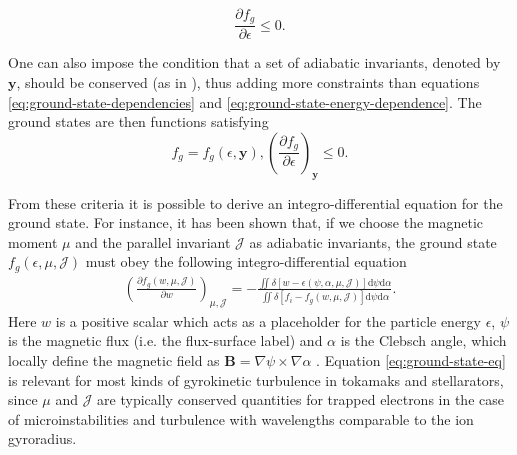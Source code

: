     \begin{equation}
        \frac{\partial f_g}{\partial \epsilon} \leq 0.
        \label{eq:ground-state-energy-dependence}
    \end{equation}
    \par
    One can also impose the condition that a set of adiabatic invariants, denoted by $\boldsymbol{y}$, should be conserved (as in \cite{Helander2017AvailablePlasmas,Helander2020AvailablePlasmas}), thus adding more constraints than equations \eqref{eq:ground-state-dependencies} and \eqref{eq:ground-state-energy-dependence}. The ground states are then functions satisfying
    \begin{subequations}
    \begin{equation}
        f_g = f_g(\epsilon, \boldsymbol{y}),
    \end{equation}
    \begin{equation}
        \left( \frac{\partial f_g}{ \partial \epsilon } \right)_{\boldsymbol{y}}  \leq 0.
    \end{equation}
        \label{eq:ground-state-decrease-adiabatic}
    \end{subequations}
    \par 
    From these criteria it is possible to derive an integro-differential equation for the ground state. For instance, it has been shown that, if we choose the magnetic moment $\mu$ and the parallel invariant $\mathcal{J}$ as adiabatic invariants, the ground state $f_g(\epsilon,\mu,\mathcal{J})$ must obey the following integro-differential equation \citep{Helander2020AvailablePlasmas}
    \begin{equation}
    \begin{aligned}
        \left( \frac{ \partial f_g(w,\mu,\mathcal{J})}{\partial w} \right)_{\mu,\mathcal{J}} = - \frac{\iint \delta [w - \epsilon(\psi,\alpha,\mu,\mathcal{J})] \mathrm{d}\psi \mathrm{d}\alpha }{\iint \delta[f_i - f_g(w,\mu,\mathcal{J})] \mathrm{d}\psi \mathrm{d}\alpha }.
    \end{aligned}
    \label{eq:ground-state-eq}
    \end{equation}
    Here $w$ is a positive scalar which acts as a placeholder for the particle energy $\epsilon$, $\psi$ is the magnetic flux (i.e. the flux-surface label) and $\alpha$ is the Clebsch angle, which locally define the magnetic field as $\boldsymbol{B} = \nabla \psi \times \nabla \alpha $ \citep[see][ch.~5]{Dhaeseleer2012FluxTheory}. Equation \eqref{eq:ground-state-eq} is relevant for most kinds of gyrokinetic turbulence in tokamaks and stellarators, since $\mu$ and $\mathcal{J}$ are typically conserved quantities for trapped electrons in the case of microinstabilities and turbulence with wavelengths comparable to the ion gyroradius. 
